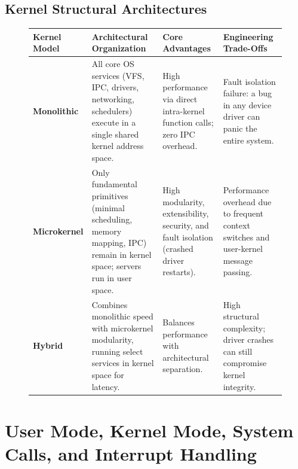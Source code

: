 \subsection{Kernel Structural Architectures}
\begin{figure}[htbp]
\centering
\small
\begin{tabularx}{\textwidth}{l p{4.2cm} X X}
\toprule
\textbf{Kernel Model} & \textbf{Architectural Organization} & \textbf{Core Advantages} & \textbf{Engineering Trade-Offs} \\
\midrule
\textbf{Monolithic} & All core OS services (VFS, IPC, drivers, networking, schedulers) execute in a single shared kernel address space. & High performance via direct intra-kernel function calls; zero IPC overhead. & Fault isolation failure: a bug in any device driver can panic the entire system. \\
\textbf{Microkernel} & Only fundamental primitives (minimal scheduling, memory mapping, IPC) remain in kernel space; servers run in user space. & High modularity, extensibility, security, and fault isolation (crashed driver restarts). & Performance overhead due to frequent context switches and user-kernel message passing. \\
\textbf{Hybrid} & Combines monolithic speed with microkernel modularity, running select services in kernel space for latency. & Balances performance with architectural separation. & High structural complexity; driver crashes can still compromise kernel integrity. \\
\bottomrule
\end{tabularx}
\end{figure}

\section{User Mode, Kernel Mode, System Calls, and Interrupt Handling}
\label{sec:os_dual_mode}

